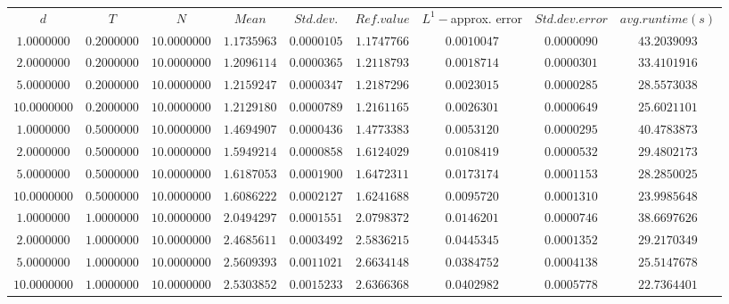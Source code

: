 \begin{tabular}{ccccccccc}
$d$ & $T$ & $N$ & $Mean$ & $Std. dev.$ & $Ref. value$ & $L^1-$approx. error & $Std. dev. error$ & $avg. runtime (s)$\\
$1.0000000$ & $0.2000000$ & $10.0000000$ & $1.1735963$ & $0.0000105$ & $1.1747766$ & $0.0010047$ & $0.0000090$ & $43.2039093$\\
$2.0000000$ & $0.2000000$ & $10.0000000$ & $1.2096114$ & $0.0000365$ & $1.2118793$ & $0.0018714$ & $0.0000301$ & $33.4101916$\\
$5.0000000$ & $0.2000000$ & $10.0000000$ & $1.2159247$ & $0.0000347$ & $1.2187296$ & $0.0023015$ & $0.0000285$ & $28.5573038$\\
$10.0000000$ & $0.2000000$ & $10.0000000$ & $1.2129180$ & $0.0000789$ & $1.2161165$ & $0.0026301$ & $0.0000649$ & $25.6021101$\\
$1.0000000$ & $0.5000000$ & $10.0000000$ & $1.4694907$ & $0.0000436$ & $1.4773383$ & $0.0053120$ & $0.0000295$ & $40.4783873$\\
$2.0000000$ & $0.5000000$ & $10.0000000$ & $1.5949214$ & $0.0000858$ & $1.6124029$ & $0.0108419$ & $0.0000532$ & $29.4802173$\\
$5.0000000$ & $0.5000000$ & $10.0000000$ & $1.6187053$ & $0.0001900$ & $1.6472311$ & $0.0173174$ & $0.0001153$ & $28.2850025$\\
$10.0000000$ & $0.5000000$ & $10.0000000$ & $1.6086222$ & $0.0002127$ & $1.6241688$ & $0.0095720$ & $0.0001310$ & $23.9985648$\\
$1.0000000$ & $1.0000000$ & $10.0000000$ & $2.0494297$ & $0.0001551$ & $2.0798372$ & $0.0146201$ & $0.0000746$ & $38.6697626$\\
$2.0000000$ & $1.0000000$ & $10.0000000$ & $2.4685611$ & $0.0003492$ & $2.5836215$ & $0.0445345$ & $0.0001352$ & $29.2170349$\\
$5.0000000$ & $1.0000000$ & $10.0000000$ & $2.5609393$ & $0.0011021$ & $2.6634148$ & $0.0384752$ & $0.0004138$ & $25.5147678$\\
$10.0000000$ & $1.0000000$ & $10.0000000$ & $2.5303852$ & $0.0015233$ & $2.6366368$ & $0.0402982$ & $0.0005778$ & $22.7364401$\\
\end{tabular}
